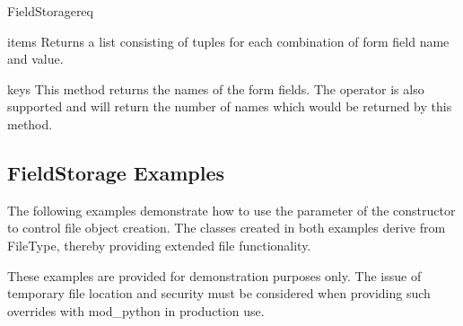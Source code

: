 \begin{classdesc}{FieldStorage}{req}
  \begin{methoddesc}[FieldStorage]{items}{}
    Returns a list consisting of tuples for each combination of form
    field name and value.
  \end{methoddesc}

  \begin{methoddesc}[FieldStorage]{keys}{}
    This method returns the names of the form fields. The 
    operator is also supported and will return the number of names
    which would be returned by this method.
  \end{methoddesc}

\end{classdesc}

\subsection{FieldStorage Examples\label{pyapi-util-fstor-examples}}

  The following examples demonstrate how to use the  
  parameter of the  constructor to control file
  object creation. The  classes created in both 
  examples derive from FileType, thereby providing extended file
  functionality.

  These examples are provided for demonstration purposes only. The 
  issue of temporary file location and security must be considered
  when providing such overrides with mod_python in production use.

